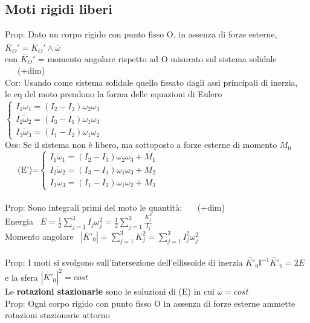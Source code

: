 \documentclass{article}
\theoremstyle{unnumbered}
\theoremstyle{unnumbered1}
\begin{document}
\subsection{Moti rigidi liberi}
%
Prop: Dato un corpo rigido con punto fisso O, in assenza di forze esterne, $\dot{\overline{K}}_O'=\overline{K}_O'\wedge\overline{\omega}$ \\ 
\phantom{Prop: }con $\overline{K}_O'$ = momento angolare rispetto ad O misurato sul sistema solidale \ \ \ (+dim)\\
%
Cor: Usando come sistema solidale quello fissato dagli assi principali di inerzia,\\
\phantom{Cor: }le eq del moto prendono la forma delle equazioni di Eulero \ $\begin{cases}
I_1\dot{\omega}_1=(I_2-I_3)\omega_2\omega_3 \\
I_2\dot{\omega}_2=(I_3-I_1)\omega_1\omega_3\\
I_3\dot{\omega}_3=(I_1-I_2)\omega_1\omega_2
\end{cases}$ \\
%
%
%
Oss: Se il sistema non è libero, ma sottoposto a forze esterne di momento $\overline{M}_0$ \ \ \ (E')=$\begin{cases}
I_1\dot{\omega}_1=(I_2-I_3)\omega_2\omega_3 + M_1 \\
I_2\dot{\omega}_2=(I_3-I_1)\omega_1\omega_3 +M_2\\
I_3\dot{\omega}_3=(I_1-I_2)\omega_1\omega_2 +M_3
\end{cases}$ \\ \\ %
%
%
Prop: Sono integrali primi del moto le quantità: \ \ \ (+dim) \\
\phantom{Prop: }Energia \ $ E=\frac{1}{2}\sum_{j=1}^3I_j\omega_j^2 = \frac{1}{2}\sum_{j=1}^3\frac{K_j^2}{I_j}$\\
\phantom{Prop: }Momento angolare \ $|\overline{K}'_0|=\sum_{j=1}^3 K_j^2=\sum_{j=1}^3I_j^2\omega_j^2$ \\ \\
%
Prop: I moti si svolgono sull'intersezione dell'ellissoide di inerzia $\overline{K'}_0\mathbb{I}^{-1}\overline{K'}_0=2E$ e la sfera $|\overline{K'}_0|^2=cost$ \\
%
%
%
Le \textbf{rotazioni stazionarie} sono le soluzioni di (E) in cui $\overline{\omega}=cost$\\
%
%
Prop: Ogni corpo rigido con punto fisso O in assenza di forze esterne ammette rotazioni stazionarie attorno\\
\end{document}
